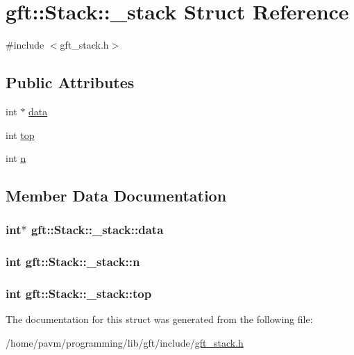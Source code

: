 \hypertarget{structgft_1_1Stack_1_1__stack}{\section{gft\-:\-:Stack\-:\-:\-\_\-stack Struct Reference}
\label{structgft_1_1Stack_1_1__stack}
}


{\ttfamily \#include $<$gft\-\_\-stack.\-h$>$}

\subsection*{Public Attributes}
\begin{DoxyCompactItemize}
\item 
int $\ast$ \hyperlink{structgft_1_1Stack_1_1__stack_a93d186ca69875dc174c659e326610b50}{data}
\item 
int \hyperlink{structgft_1_1Stack_1_1__stack_a6f43582a8f8320933cdbe130127c21ae}{top}
\item 
int \hyperlink{structgft_1_1Stack_1_1__stack_afa89595ba64b8fb3c0b3e9aec3bc2639}{n}
\end{DoxyCompactItemize}


\subsection{Member Data Documentation}
\hypertarget{structgft_1_1Stack_1_1__stack_a93d186ca69875dc174c659e326610b50}{
\subsubsection[{data}]{\setlength{\rightskip}{0pt plus 5cm}int$\ast$ gft\-::\-Stack\-::\-\_\-stack\-::data}}\label{structgft_1_1Stack_1_1__stack_a93d186ca69875dc174c659e326610b50}
\hypertarget{structgft_1_1Stack_1_1__stack_afa89595ba64b8fb3c0b3e9aec3bc2639}{
\subsubsection[{n}]{\setlength{\rightskip}{0pt plus 5cm}int gft\-::\-Stack\-::\-\_\-stack\-::n}}\label{structgft_1_1Stack_1_1__stack_afa89595ba64b8fb3c0b3e9aec3bc2639}
\hypertarget{structgft_1_1Stack_1_1__stack_a6f43582a8f8320933cdbe130127c21ae}{
\subsubsection[{top}]{\setlength{\rightskip}{0pt plus 5cm}int gft\-::\-Stack\-::\-\_\-stack\-::top}}\label{structgft_1_1Stack_1_1__stack_a6f43582a8f8320933cdbe130127c21ae}


The documentation for this struct was generated from the following file\-:\begin{DoxyCompactItemize}
\item 
/home/pavm/programming/lib/gft/include/\hyperlink{gft__stack_8h}{gft\-\_\-stack.\-h}\end{DoxyCompactItemize}
